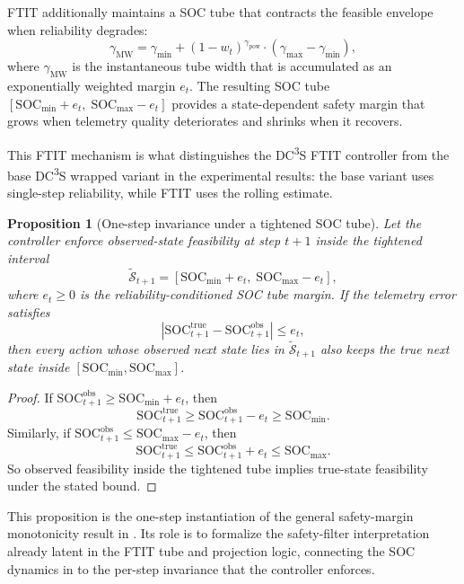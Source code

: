 \documentclass[11pt,a4paper]{article}
\newtheorem{proposition}{Proposition}
\begin{document}
FTIT additionally maintains a SOC tube that contracts the feasible envelope when reliability degrades:
\begin{equation}\label{eq:soc_tube}
  \gamma_{\text{MW}} = \gamma_{\min} + (1 - w_t)^{\gamma_{\text{pow}}} \cdot (\gamma_{\max} - \gamma_{\min}),
\end{equation}
where $\gamma_{\text{MW}}$ is the instantaneous tube width that is accumulated as an exponentially weighted margin $e_t$. The resulting SOC tube $[\mathrm{SOC}_{\min} + e_t,\; \mathrm{SOC}_{\max} - e_t]$ provides a state-dependent safety margin that grows when telemetry quality deteriorates and shrinks when it recovers.

This FTIT mechanism is what distinguishes the DC\textsuperscript{3}S FTIT controller from the base DC\textsuperscript{3}S wrapped variant in the experimental results: the base variant uses single-step reliability, while FTIT uses the rolling estimate.

\begin{proposition}[One-step invariance under a tightened SOC tube]\label{prop:tightened_tube}
Let the controller enforce observed-state feasibility at step $t+1$ inside the tightened interval
\[
  \tilde{\mathcal{S}}_{t+1} = [\mathrm{SOC}_{\min} + e_t,\; \mathrm{SOC}_{\max} - e_t],
\]
where $e_t \ge 0$ is the reliability-conditioned SOC tube margin. If the telemetry error satisfies
\[
  |\mathrm{SOC}^{\mathrm{true}}_{t+1} - \mathrm{SOC}^{\mathrm{obs}}_{t+1}| \le e_t,
\]
then every action whose observed next state lies in $\tilde{\mathcal{S}}_{t+1}$ also keeps the true next state inside $[\mathrm{SOC}_{\min}, \mathrm{SOC}_{\max}]$.
\end{proposition}
\begin{proof}
If $\mathrm{SOC}^{\mathrm{obs}}_{t+1} \ge \mathrm{SOC}_{\min} + e_t$, then
\[
  \mathrm{SOC}^{\mathrm{true}}_{t+1} \ge \mathrm{SOC}^{\mathrm{obs}}_{t+1} - e_t \ge \mathrm{SOC}_{\min}.
\]
Similarly, if $\mathrm{SOC}^{\mathrm{obs}}_{t+1} \le \mathrm{SOC}_{\max} - e_t$, then
\[
  \mathrm{SOC}^{\mathrm{true}}_{t+1} \le \mathrm{SOC}^{\mathrm{obs}}_{t+1} + e_t \le \mathrm{SOC}_{\max}.
\]
So observed feasibility inside the tightened tube implies true-state feasibility under the stated bound.
\end{proof}

This proposition is the one-step instantiation of the general safety-margin monotonicity result in . Its role is to formalize the safety-filter interpretation already latent in the FTIT tube and projection logic, connecting the SOC dynamics in  to the per-step invariance that the controller enforces.
\end{document}
